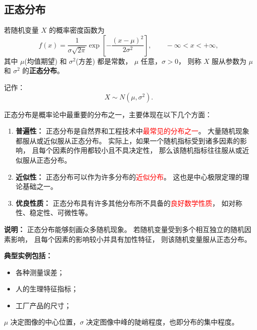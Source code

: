 \subsection{正态分布}
\begin{definition}
若随机变量 $X$ 的概率密度函数为
\[
f(x) = \frac{1}{\sigma\sqrt{2\pi}} 
       \exp\!\left[-\frac{(x-\mu)^2}{2\sigma^2}\right],
\qquad -\infty < x < +\infty,
\]
其中 $\mu$(均值期望) 和 $\sigma^2$(方差) 都是常数，
$\mu$ 任意，$\sigma > 0$，
则称 $X$ 服从参数为 $\mu$ 和 $\sigma^2$ 的\textbf{正态分布}。

记作：
\[
X \sim N(\mu, \sigma^2).
\]
\end{definition}
\begin{proposition}[正态分布的重要性与普遍性]
正态分布是概率论中最重要的分布之一，主要体现在以下几个方面：

\begin{enumerate}
  \item \textbf{普遍性：}
  正态分布是自然界和工程技术中\textcolor{red}{最常见的分布之一}。
  大量随机现象都服从或近似服从正态分布。
  实际上，如果一个随机指标受到诸多因素的影响，
  且每个因素的作用都较小且不具决定性，
  那么该随机指标往往服从或近似服从正态分布。
  
  \item \textbf{近似性：}
  正态分布可以作为许多分布的\textcolor{red}{近似分布}。
  这也是中心极限定理的理论基础之一。
  
  \item \textbf{优良性质：}
  正态分布具有许多其他分布所不具备的\textcolor{red}{良好数学性质}，
  如对称性、稳定性、可微性等。
\end{enumerate}

\vspace{1em}

\textbf{说明：}
正态分布能够刻画众多随机现象。
若随机变量受到多个相互独立的随机因素影响，
且每个因素的影响较小并具有加性特征，
则该随机变量服从正态分布。

\textbf{典型实例包括：}
\begin{itemize}
  \item 各种测量误差；
  \item 人的生理特征指标；
  \item 工厂产品的尺寸；
  
\end{itemize}
\end{proposition}
$\mu$ 决定图像的中心位置，$\sigma$ 决定图像中峰的陡峭程度，也即分布的集中程度。
